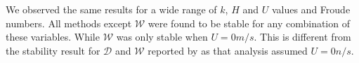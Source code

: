 
We observed the same results for a wide range of $k$, $H$ and $U$ values and Froude numbers. All methods except $\mathcal{W}$ were found to be stable for any combination of these variables. While $\mathcal{W}$ was only stable when $U = 0m/s$. This is different from the stability result for $\mathcal{D}$ and $\mathcal{W}$ reported by \cite{Pitt-2018-61} as that analysis assumed $U=0n/s$.



